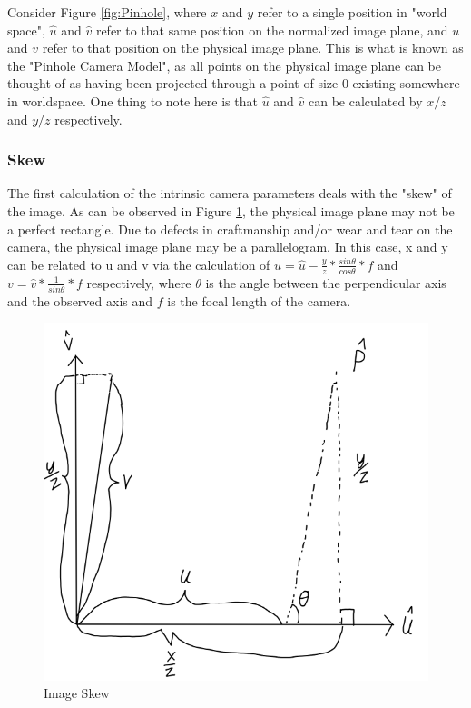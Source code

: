 Consider Figure \ref{fig:Pinhole}, where $x$ and $y$ refer to a single position in "world space", $\hat{u}$ and $\hat{v}$ refer to that same position on the normalized image plane, and $u$ and $v$ refer to that position on the physical image plane.  This is what is known as the "Pinhole Camera Model", as all points on the physical image plane can be thought of as having been projected through a point of size 0 existing somewhere in worldspace.  One thing to note here is that $\hat{u}$ and $\hat{v}$ can be calculated by $x/z$ and $y/z$ respectively.
\subsubsection{Skew}
The first calculation of the intrinsic camera parameters deals with the "skew" of the image.  As can be observed in Figure \ref{fig:Skew}, the physical image plane may not be a perfect rectangle.  Due to defects in craftmanship and/or wear and tear on the camera, the physical image plane may be a parallelogram.  In this case, x and y can be related to u and v via the calculation of $u=\hat{u}-\frac{y}{z} * \frac{sin  \theta }{ cos \theta} * f$ and $v=\hat{v}*\frac{1}{sin \theta} * f$ respectively, where $\theta$ is the angle between the perpendicular axis and the observed axis and $f$ is the focal length of the camera.
\begin{figure}[h!]
\begin{center}
	\includegraphics[scale=.5]{Image2}
	\caption{Image Skew}
	\label{fig:Skew}
\end{center}
\end{figure}

